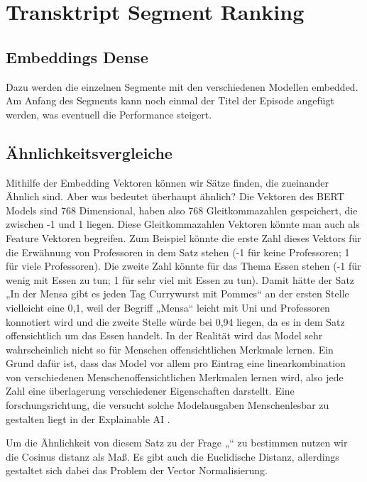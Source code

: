 \section{Transktript Segment Ranking}



\subsection{Embeddings Dense}

Dazu werden die einzelnen Segmente mit den verschiedenen Modellen embedded.
Am Anfang des Segments kann noch einmal der Titel der Episode angefügt werden, was eventuell die Performance steigert.\cite{jones2021}



\subsection{Ähnlichkeitsvergleiche}

Mithilfe der Embedding Vektoren können wir Sätze finden, die zueinander Ähnlich sind. 
Aber was bedeutet überhaupt ähnlich? 
Die Vektoren des BERT Models sind 768 Dimensional, haben also 768 Gleitkommazahlen gespeichert, die zwischen -1 und 1 liegen. 
Diese Gleitkommazahlen Vektoren könnte man auch als Feature Vektoren begreifen. 
Zum Beispiel könnte die erste Zahl dieses Vektors für die Erwähnung von Professoren in dem Satz stehen (-1 für keine Professoren; 1 für viele Professoren). 
Die zweite Zahl könnte für das Thema Essen stehen (-1 für wenig mit Essen zu tun; 1 für sehr viel mit Essen zu tun). 
Damit hätte der Satz „In der Mensa gibt es jeden Tag Currywurst mit Pommes“ an der ersten Stelle vielleicht eine 0,1, weil der Begriff „Mensa“ leicht mit Uni und Professoren konnotiert wird und die zweite Stelle würde bei 0,94 liegen, da es in dem Satz offensichtlich um das Essen handelt. 
In der Realität wird das Model sehr wahrscheinlich nicht so für Menschen offensichtlichen Merkmale lernen. Ein Grund dafür ist, dass das Model vor allem pro Eintrag eine linearkombination von verschiedenen Menschenoffensichtlichen Merkmalen lernen wird, also jede Zahl eine überlagerung verschiedener Eigenschaften darstellt. 
Eine forschungsrichtung, die versucht solche Modelausgaben Menschenlesbar zu gestalten liegt in der Explainable AI \cite{hassija2024}.

Um die Ähnlichkeit von diesem Satz zu der Frage „“ zu bestimmen nutzen wir die Cosinus distanz als Maß. Es gibt auch die Euclidische Distanz, allerdings gestaltet sich dabei das Problem der Vector Normalisierung.


